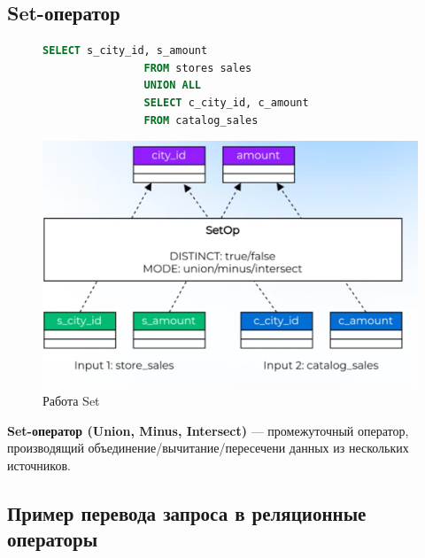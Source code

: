 \documentclass[11pt]{article}
\begin{document}
    \newpage

    \subsection{Set-оператор}

    \begin{figure}[h!]
        \begin{minipage}{0.4\textwidth}
            \begin{lstlisting}[language=SQL, caption={SQL приводящий в Set}]
                SELECT s_city_id, s_amount
                FROM stores sales
                UNION ALL
                SELECT c_city_id, c_amount
                FROM catalog_sales
            \end{lstlisting}
        \end{minipage}
        \begin{minipage}{0.6\textwidth}
            \centering
            \includegraphics[width=\textwidth]{Pictures/Operators/Set}
            \caption{Работа Set}
        \end{minipage}
    \end{figure}

    \textbf{Set-оператор (Union, Minus, Intersect)} --- промежуточный оператор, производящий объединение/вычитание/пересечени данных из нескольких источников.

    \newpage

    \subsection{Пример перевода запроса в реляционные операторы}
\end{document}
